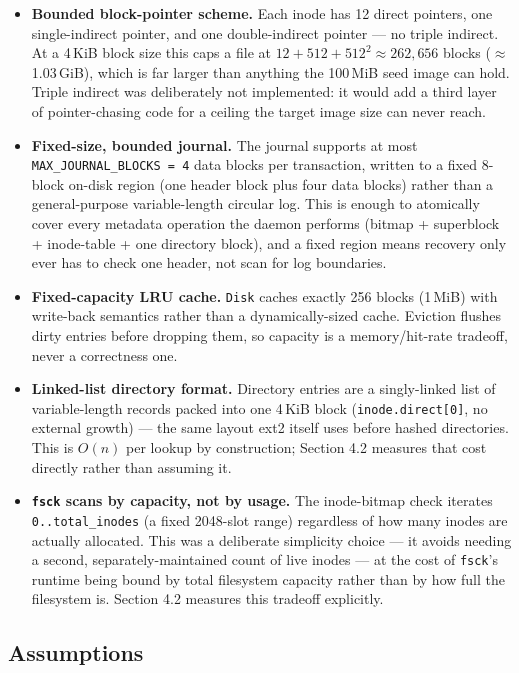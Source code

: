 \documentclass[11pt]{article}
\begin{document}
\begin{itemize}
    \item \textbf{Bounded block-pointer scheme.} Each inode has 12 direct pointers, one single-indirect
    pointer, and one double-indirect pointer — no triple indirect. At a 4\,KiB block size this caps a
    file at $12 + 512 + 512^2 \approx 262{,}656$ blocks ($\approx$1.03\,GiB), which is far larger than
    anything the 100\,MiB seed image can hold. Triple indirect was deliberately not implemented: it would
    add a third layer of pointer-chasing code for a ceiling the target image size can never reach.
    \item \textbf{Fixed-size, bounded journal.} The journal supports at most \texttt{MAX\_JOURNAL\_BLOCKS = 4}
    data blocks per transaction, written to a fixed 8-block on-disk region (one header block plus four data
    blocks) rather than a general-purpose variable-length circular log. This is enough to atomically cover
    every metadata operation the daemon performs (bitmap + superblock + inode-table + one directory block),
    and a fixed region means recovery only ever has to check one header, not scan for log boundaries.
    \item \textbf{Fixed-capacity LRU cache.} \texttt{Disk} caches exactly 256 blocks (1\,MiB) with
    write-back semantics rather than a dynamically-sized cache. Eviction flushes dirty entries before
    dropping them, so capacity is a memory/hit-rate tradeoff, never a correctness one.
    \item \textbf{Linked-list directory format.} Directory entries are a singly-linked list of
    variable-length records packed into one 4\,KiB block (\texttt{inode.direct[0]}, no external growth) — the
    same layout ext2 itself uses before hashed directories. This is $O(n)$ per lookup by construction; Section
    4.2 measures that cost directly rather than assuming it.
    \item \textbf{\texttt{fsck} scans by capacity, not by usage.} The inode-bitmap check iterates
    \texttt{0..total\_inodes} (a fixed 2048-slot range) regardless of how many inodes are actually allocated.
    This was a deliberate simplicity choice — it avoids needing a second, separately-maintained count of live
    inodes — at the cost of \texttt{fsck}'s runtime being bound by total filesystem capacity rather than by how
    full the filesystem is. Section 4.2 measures this tradeoff explicitly.
\end{itemize}

\subsection{Assumptions}
\end{document}
